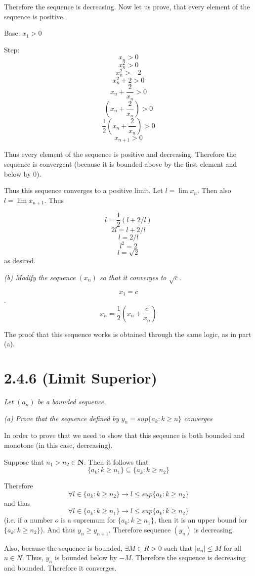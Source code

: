 \documentclass[11pt,oneside,titlepage]{book}
\begin{document}
Therefore the sequence is decreasing. Now let us prove, that every element of the
sequence is positive.

Base: $x_1 > 0$

Step:
$$x_n> 0$$
$$x_n^2 > 0$$
$$x_n^2 > -2$$
$$x_n^2 + 2 > 0$$
$$x_n + \frac{2}{x_n} > 0$$
$$(x_n + \frac{2}{x_n}) > 0$$
$$\frac{1}{2}(x_n + \frac{2}{x_n}) > 0$$
$$x_{n + 1} > 0$$

Thus every element of the sequence is positive and decreasing. Therefore the
sequence is convergent (because it is bounded above by the first element and
below by 0).

Thus this sequence converges to a positive limit. Let $l = \lim x_n$. Then also
$l = \lim x_{n + 1}$. Thus

$$l = \frac{1}{2}(l + 2/l)$$
$$2 l = l + 2/l$$
$$l = 2/l$$
$$l^2 = 2$$
$$l = \sqrt{2}$$
as desired.

\textit{(b) Modify the sequence $(x_n)$ so that it converges to $\sqrt{c}$. }

$$x_1 = c$$.
$$x_n =  \frac{1}{2}(x_n + \frac{c}{x_n})$$

The proof that this sequence works is obtained through the same logic, as in part (a).

\section*{2.4.6 (Limit Superior)}
\textit{Let $(a_n)$ be a bounded sequence.}

\textit{(a) Prove that the sequence defined by $y_n = sup\{a_k: k \geq n\}$
  converges}

In order to prove that we need to show that this seqeunce is both bounded and
monotone (in this case, decreasing).

Suppose that $n_1 > n_2 \in \textbf{N}$. Then it follows that
$$\{a_k: k \geq n_1\} \subseteq \{a_k: k \geq n_2\}$$

Therefore 
$$\forall l \in \{a_k: k \geq n_2\} \to l \leq sup\{a_k: k \geq n_2\}$$
and thus
$$\forall l \in \{a_k: k \geq n_1\} \to l \leq sup\{a_k: k \geq n_2\}$$
(i.e. if a number $o$ is a supremum for $\{a_k: k \geq n_1\}$, then
it is an upper bound for $\{a_k: k \geq n_2\}$).
And thus $y_n \geq y_{n + 1}$. Therefore sequence $(y_n)$ is decreasing.

Also, because the sequence is bounded, $\exists M \in R > 0$ such that
$|a_n| \leq M$ for all $n \in N$. Thus, $y_n$ is bounded below by $-M$.
Therefore the sequence is decreasing and bounded. Therefore it converges.
\end{document}
